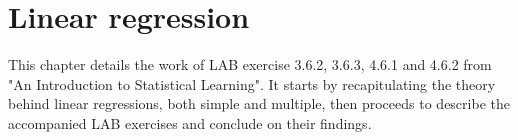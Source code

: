 \chapter{Linear regression} \label{ch:regression}

This chapter details the work of LAB exercise 3.6.2, 3.6.3, 4.6.1 and 4.6.2 from "An Introduction to Statistical Learning". It starts by recapitulating the theory behind linear regressions, both simple and multiple, then proceeds to describe the accompanied LAB exercises and conclude on their findings.



